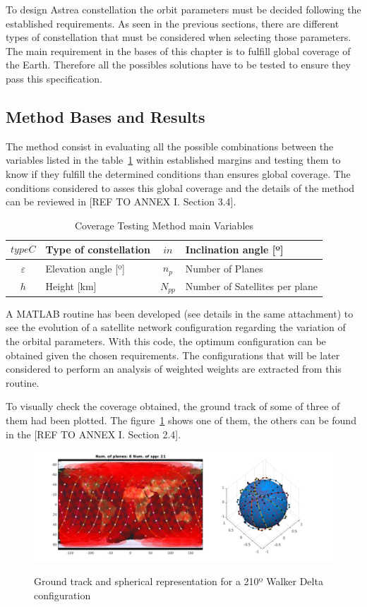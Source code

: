 
To design Astrea constellation the orbit parameters must be decided following the established requirements. As seen in the previous sections, there are different types of constellation that must be considered when selecting those parameters. The main requirement in the bases of this chapter is to fulfill global coverage of the Earth. Therefore all the possibles solutions have to be tested to ensure they pass this specification.

\subsection{Method Bases and Results}
The method consist in evaluating all the possible combinations between the variables listed in the table~\ref{t:CovVar} within established margins and  testing them to know if they fulfill the determined conditions than ensures global coverage. The conditions considered to asses this global coverage and the details of the method can be reviewed in [REF TO ANNEX I. Section 3.4]. %

\begin{table}[H]
\centering
\begin{tabular}{|c|l|c|l|}
\hline
$$typeC$$     & Type of constellation    & $$in$$  & Inclination angle {[}º{]} \\ \hline
$\varepsilon$ & Elevation angle {[}º{]}  & $n_{p}$ & Number of Planes                          \\ \hline
$$h$$         & Height  {[}km{]}  & $N_{pp}$ & Number of Satellites per plane            \\ \hline
\end{tabular}
\caption{Coverage Testing Method main Variables}
\label{t:CovVar}
\end{table}  

A MATLAB routine has been developed (see details in the same attachment) to see the evolution of a satellite network configuration regarding the variation of the orbital parameters. With this code, the optimum configuration can be obtained given the chosen requirements. The configurations that will be later considered to perform an analysis of weighted weights are extracted from this routine.

To visually check the coverage obtained, the ground track of some of three of them had been plotted. The figure~\ref{fig:gt210} shows one of them, the others can be found in the [REF TO ANNEX I. Section 2.4]. 


\begin{figure}[H] %
	\centering
	\includegraphics[width=.8\textwidth]{./testing/WB210.png}\\
	\caption{Ground track and spherical representation for a 210º Walker Delta configuration}
	\label{fig:gt210}
\end{figure}